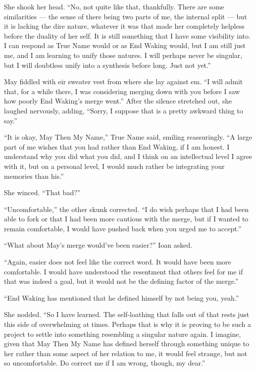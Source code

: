 She shook her head. ``No, not quite like that, thankfully. There are some similarities — the sense of there being two parts of me, the internal split — but it is lacking the dire nature, whatever it was that made her completely helpless before the duality of her self. It is still something that I have some visibility into. I can respond as True Name would or as End Waking would, but I am still just me, and I am learning to unify those natures. I will perhaps never be singular, but I will doubtless unify into a synthesis before long. Just not yet.''

May fiddled with eir sweater vest from where she lay against em. ``I will admit that, for a while there, I was considering merging down with you before I saw how poorly End Waking's merge went.'' After the silence stretched out, she laughed nervously, adding, ``Sorry, I suppose that is a pretty awkward thing to say.''

``It is okay, May Then My Name,'' True Name said, smiling reassuringly. ``A large part of me wishes that you had rather than End Waking, if I am honest. I understand why you did what you did, and I think on an intellectual level I agree with it, but on a personal level, I would much rather be integrating your memories than his.''

She winced. ``That bad?''

``Uncomfortable,'' the other skunk corrected. ``I do wish perhaps that I had been able to fork or that I had been more cautious with the merge, but if I wanted to remain comfortable, I would have pushed back when you urged me to accept.''

``What about May's merge would've been easier?'' Ioan asked.

``Again, easier does not feel like the correct word. It would have been more comfortable. I would have understood the resentment that others feel for me if that was indeed a goal, but it would not be the defining factor of the merge.''

``End Waking has mentioned that he defined himself by not being you, yeah.''

She nodded. ``So I have learned. The self-loathing that falls out of that rests just this side of overwhelming at times. Perhaps that is why it is proving to be such a project to settle into something resembling a singular nature again. I imagine, given that May Then My Name has defined herself through something unique to her rather than some aspect of her relation to me, it would feel strange, but not so uncomfortable. Do correct me if I am wrong, though, my dear.''

